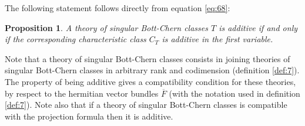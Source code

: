 \documentclass[10pt,twoside]{article}
\numberwithin{equation}{section}
\theoremstyle{plain}
\newtheorem{proposition}[equation]{Proposition}
\theoremstyle{definition}
\begin{document}
The following statement follows directly from equation \ref{eq:68}:
\begin{proposition}
A theory of singular Bott-Chern classes $T$ is additive if and only
if the corresponding characteristic class $C_T$ is additive in the
first variable.
\end{proposition}

Note that a theory of singular Bott-Chern classes consists in joining
theories of singular Bott-Chern classes in arbitrary rank and
codimension (definition \ref{def:7}). The property of being additive
gives a compatibility condition for these theories, by respect to the
hermitian vector bundles $\overline{F}$ (with the notation used in
definition \ref{def:7}). Note also that if a theory of singular
Bott-Chern classes is compatible with the projection formula then it
is additive.
\end{document}
